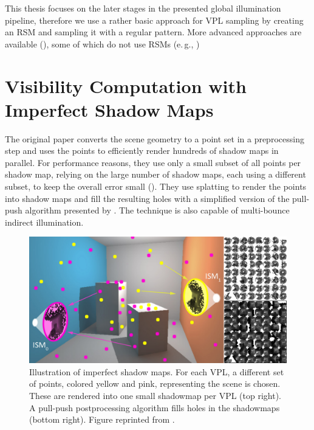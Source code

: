 This thesis focuses on the later stages in the presented global illumination pipeline, therefore we use a rather basic approach for VPL sampling by creating an RSM and sampling it with a regular pattern. More advanced approaches are available (), some of which do not use RSMs (e.\,g., \cite{hedman2016sequential})


\section{Visibility Computation with Imperfect Shadow Maps}
\label{sec:concept:ism}

The original paper \citep{ritschel2008ism} converts the scene geometry to a point set in a preprocessing step and uses the points to efficiently render hundreds of shadow maps in parallel. For performance reasons, they use only a small subset of all points per shadow map, relying on the large number of shadow maps, each using a different subset, to keep the overall error small (). They use splatting to render the points into shadow maps and fill the resulting holes with a simplified version of the pull-push algorithm presented by \citet{Marroquim:2007:reconstruction}. The technique is also capable of multi-bounce indirect illumination.

\begin{figure}[htb]
\centering
    \includegraphics[width=\textwidth]{graphics/ism_ritschel_08}
  \caption{Illustration of imperfect shadow maps. For each VPL, a different set of points, colored yellow and pink, representing the scene is chosen. These are rendered into one small shadowmap per VPL (top right). A pull-push postprocessing algorithm fills holes in the shadowmaps (bottom right). Figure reprinted from \citet{ritschel2008ism}.}
  \label{fig:concept:ism_ritschel_08}
\end{figure}

